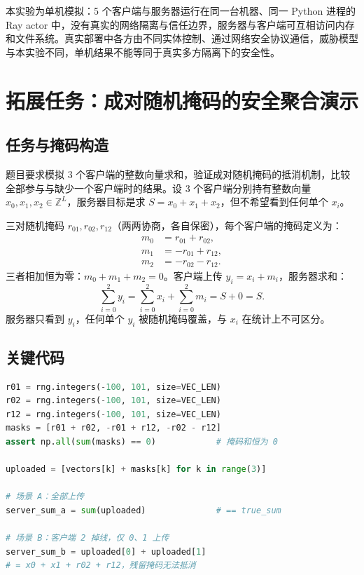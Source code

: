 \documentclass{SYSUReport}
\begin{document}
本实验为单机模拟：5 个客户端与服务器运行在同一台机器、同一 Python 进程的 Ray actor 中，没有真实的网络隔离与信任边界，服务器与客户端可互相访问内存和文件系统。真实部署中各方由不同实体控制、通过网络安全协议通信，威胁模型与本实验不同，单机结果不能等同于真实多方隔离下的安全性。

\section{拓展任务：成对随机掩码的安全聚合演示}
\label{sec:secure-agg}

\subsection{任务与掩码构造}

题目要求模拟 3 个客户端的整数向量求和，验证成对随机掩码的抵消机制，比较全部参与与缺少一个客户端时的结果。设 3 个客户端分别持有整数向量 $x_0, x_1, x_2 \in \mathbb{Z}^L$，服务器目标是求 $S = x_0 + x_1 + x_2$，但不希望看到任何单个 $x_i$。

三对随机掩码 $r_{01}, r_{02}, r_{12}$（两两协商，各自保密），每个客户端的掩码定义为：
\begin{align}
m_0 &= r_{01} + r_{02}, \\
m_1 &= -r_{01} + r_{12}, \\
m_2 &= -r_{02} - r_{12}.
\end{align}
三者相加恒为零：$m_0 + m_1 + m_2 = 0$。客户端上传 $y_i = x_i + m_i$，服务器求和：
\begin{equation}
\sum_{i=0}^{2} y_i = \sum_{i=0}^{2} x_i + \sum_{i=0}^{2} m_i = S + 0 = S.
\end{equation}
服务器只看到 $y_i$，任何单个 $y_i$ 被随机掩码覆盖，与 $x_i$ 在统计上不可区分。

\subsection{关键代码}

\begin{lstlisting}[language=Python, caption={掩码构造与两种场景（secure\_agg\_demo.py）}]
r01 = rng.integers(-100, 101, size=VEC_LEN)
r02 = rng.integers(-100, 101, size=VEC_LEN)
r12 = rng.integers(-100, 101, size=VEC_LEN)
masks = [r01 + r02, -r01 + r12, -r02 - r12]
assert np.all(sum(masks) == 0)            # 掩码和恒为 0

uploaded = [vectors[k] + masks[k] for k in range(3)]

# 场景 A：全部上传
server_sum_a = sum(uploaded)              # == true_sum

# 场景 B：客户端 2 掉线，仅 0、1 上传
server_sum_b = uploaded[0] + uploaded[1]
# = x0 + x1 + r02 + r12，残留掩码无法抵消
\end{lstlisting}
\end{document}
